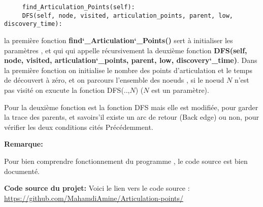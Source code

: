 \documentclass[12pt]{report}
\begin{document}
\lstset{language=Python}
\lstset{frame=lines}
\lstset{basicstyle=\footnotesize}
\begin{lstlisting}
     find_Articulation_Points(self):
     DFS(self, node, visited, articulation_points, parent, low, discovery_time):
\end{lstlisting}
    \par{}          
          la première fonction \textbf{find\char`_Articulation\char`_Points()} sert à initialiser les paramètres , et qui qui appelle récursivement la deuxième fonction \textbf{DFS(self, node, visited, articulation\char`_points, parent, low, discovery\char`_time)}.
          \newline
          Dans la première fonction on initialise le nombre des points d'articulation et le temps de découvert à zéro, et on parcours l'ensemble des noeuds , si le noeud $N$ n'est pas visité on exucute la fonction DFS(..,$N$) ($N$ est un paramètre).
    \par{}
          Pour la deuxième fonction est la fonction DFS mais elle est modifiée, pour garder la trace des parents, et savoirs'il existe un arc de retour (Back edge) ou non, pour vérifier les deux conditions cités Précédemment. 
          \par{}
          \textbf{Remarque:} 
          \par{}
          Pour bien comprendre fonctionnement du programme  , le code source est bien documenté.
          \par{}
          \textbf{Code source du projet: } 
          \newline
          Voici  le lien vers le code source :
          \newline
           \href{https://github.com/MahamdiAmine/Articulation-points}{https://github.com/MahamdiAmine/Articulation-points/}
      \newpage     
\end{document}
